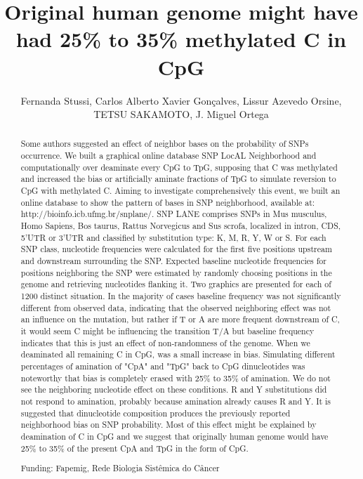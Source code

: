 \documentclass[twoside]{article}
\title{\vspace{-15mm}\fontsize{24pt}{10pt}\selectfont\textbf{ Original human genome might have had 25\% to 35\% methylated C in CpG }} %
\author{ Fernanda Stussi, Carlos Alberto Xavier Gon\c{c}alves, Lissur Azevedo Orsine, TETSU SAKAMOTO, J. Miguel Ortega }
\affil{ UFMG }
\date{}
\begin{document}
  
  
  \maketitle %
  
  
  \thispagestyle{fancy} %
  
  
  \begin{abstract}
  Some authors suggested an effect of neighbor bases on the probability of SNPs occurrence. We built a graphical online database SNP LocAL Neighborhood and computationally over deaminate every CpG to TpG,  supposing that C was methylated and increased the bias or artificially aminate fractions of TpG to simulate reversion to CpG with methylated C.
Aiming to investigate comprehensively this event,  we built an online database to show the pattern of bases in SNP neighborhood,  available at: http://bioinfo.icb.ufmg.br/snplane/. SNP LANE comprises SNPs in Mus musculus,  Homo Sapiens,  Bos taurus,  Rattus Norvegicus and Sus scrofa,  localized in intron,  CDS,  5’UTR or 3’UTR and classified by substitution type: K,  M,  R,  Y,  W or S. For each SNP class,  nucleotide frequencies were calculated for the first five positions upstream and downstream surrounding the SNP. Expected baseline nucleotide frequencies for positions neighboring the SNP were estimated by randomly choosing positions in the genome and retrieving nucleotides flanking it. Two graphics are presented for each of 1200 distinct situation.
In the majority of cases baseline frequency was not significantly different from observed data,  indicating that the observed neighboring effect was not an influence on the mutation,  but rather if T or A are more frequent downstream of C,  it would seem C might be influencing the transition T/A but baseline frequency indicates that this is just an effect of non-randomness of the genome.
When we deaminated all remaining C in CpG,  was a small increase in bias. Simulating different percentages of amination of "CpA" and "TpG" back to CpG dinucleotides was noteworthy that bias is completely erased with 25\% to 35\% of amination. We do not see the neighboring nucleotide effect on these conditions. R and Y substitutions did not respond to amination,  probably because amination already causes R and Y.
It is suggested that dinucleotide composition produces the previously reported neighborhood bias on SNP probability. Most of this effect might be explained by deamination of C in CpG and we suggest that originally human genome would have 25\% to 35\% of the present CpA and TpG in the form of CpG.
  
  Funding: Fapemig,  Rede Biologia Sist\^emica do C\^ancer \\ 
  \end{abstract}
  
\end{document}
